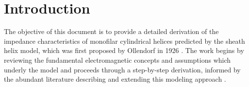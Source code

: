 \section{Introduction}\label{sec:intro}
The objective of this document is to provide a detailed derivation of the impedance characteristics of monofilar cylindrical helices predicted by the sheath helix model, which was first proposed by Ollendorf in 1926 \cite{ollendorf}. The work begins by reviewing the fundamental electromagnetic concepts and assumptions which underly the model and proceeds through a step-by-step derivation, informed by the abundant literature describing and extending this modeling approach \cite{rudenberg1, pierce1, kogan1, sensiper_thesis, poritsky1, bryant1, stark1, sichak1, sensiper1, watkins1, fano1, collin1, bondar1, vizmuller1, corum1, corum2}. 
